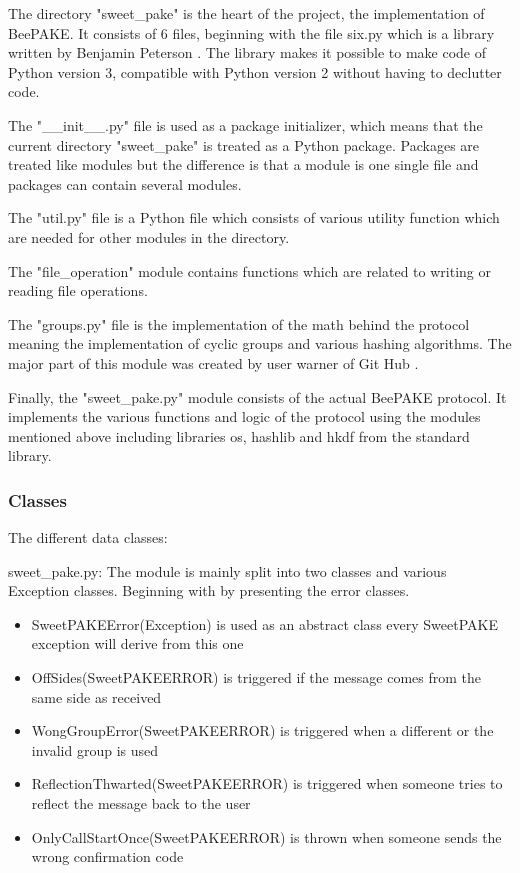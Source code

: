 \documentclass[../main.tex]{subfiles}
\begin{document}
The directory "sweet\_pake" is the heart of the project, the implementation of
BeePAKE. It consists of 6 files, beginning with the file six.py which is a
library written by Benjamin Peterson \cite{peterson2010}. The library makes it
possible to make code of Python version 3, compatible with Python version 2
without having to declutter code. 

The "\_\_init\_\_.py" file is used as a package initializer, which means
that the current directory "sweet\_pake" is treated as a Python package. Packages
are treated like modules but the difference is that a module is one single file
and packages can contain several modules.

The "util.py" file is a Python file which consists of various utility function
which are needed for other modules in the directory. 

The "file\_operation" module contains functions which are related to writing or
reading file operations. 

The "groups.py" file is the implementation of the math behind the protocol
meaning the implementation of cyclic groups and various hashing algorithms. The major
part of this module was created by user warner of Git Hub \cite{Warner2013}.

Finally, the "sweet\_pake.py" module consists of the actual BeePAKE protocol.
It implements the various functions and logic of the protocol using the modules
mentioned above including libraries os, hashlib and hkdf from the standard library.

\subsubsection{Classes}
The different data classes:

sweet\_pake.py: The module is mainly split into two classes and various
Exception classes. Beginning with by presenting the error classes.
\begin{itemize} 
	\item SweetPAKEError(Exception) is used as an abstract class every
			SweetPAKE exception will derive from this one 
	\item OffSides(SweetPAKEERROR) is triggered if the message comes from
		the same side as received
	\item WongGroupError(SweetPAKEERROR) is triggered when a different or
		the invalid group is used
	\item ReflectionThwarted(SweetPAKEERROR) is triggered when someone tries to reflect the message back to the user
	\item OnlyCallStartOnce(SweetPAKEERROR) is thrown when someone sends the wrong confirmation code
\end{itemize}
\end{document}
